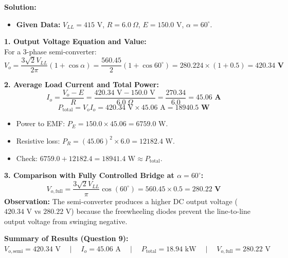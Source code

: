 \documentclass[10pt,a4paper]{article}
\begin{document}
\vspace{1mm}
\noindent\textbf{\textcolor{accentteal}{Solution:}}
\begin{itemize}
  \item \textbf{Given Data:} $V_{LL} = 415\text{ V}$, $R = 6.0\ \Omega$, $E = 150.0\text{ V}$, $\alpha = 60^\circ$.
\end{itemize}

\noindent\textbf{1. Output Voltage Equation and Value:}\\
For a 3-phase semi-converter:
\[
V_o = \frac{3\sqrt{2} V_{LL}}{2\pi} (1 + \cos\alpha) = \frac{560.45}{2} (1 + \cos 60^\circ) = 280.224 \times (1 + 0.5) = \mathbf{420.34\text{ V}}
\]

\noindent\textbf{2. Average Load Current and Total Power:}\\
\[
I_o = \frac{V_o - E}{R} = \frac{420.34\text{ V} - 150.0\text{ V}}{6.0\ \Omega} = \frac{270.34}{6.0} = \mathbf{45.06\text{ A}}
\]
\[
P_{\text{total}} = V_o I_o = 420.34\text{ V} \times 45.06\text{ A} = \mathbf{18940.5\text{ W}}
\]
\begin{itemize}
  \item Power to EMF: $P_E = 150.0 \times 45.06 = 6759.0\text{ W}$.
  \item Resistive loss: $P_R = (45.06)^2 \times 6.0 = 12182.4\text{ W}$.
  \item Check: $6759.0 + 12182.4 = 18941.4\text{ W} \approx P_{\text{total}}$.
\end{itemize}

\noindent\textbf{3. Comparison with Fully Controlled Bridge at $\alpha = 60^\circ$:}\\
\[
V_{o,\text{full}} = \frac{3\sqrt{2} V_{LL}}{\pi} \cos(60^\circ) = 560.45 \times 0.5 = \mathbf{280.22\text{ V}}
\]
\textbf{Observation:} The semi-converter produces a higher DC output voltage ($420.34\text{ V}$ vs $280.22\text{ V}$) because the freewheeling diodes prevent the line-to-line output voltage from swinging negative.

\begin{tcolorbox}[resbox]
\textbf{\textcolor{accentcyan}{Summary of Results (Question 9):}}\\
$V_{o,\text{semi}} = 420.34\text{ V} \quad\mid\quad I_o = 45.06\text{ A} \quad\mid\quad P_{\text{total}} = 18.94\text{ kW} \quad\mid\quad V_{o,\text{full}} = 280.22\text{ V}$
\end{tcolorbox}

\vspace{5mm}

\end{document}
